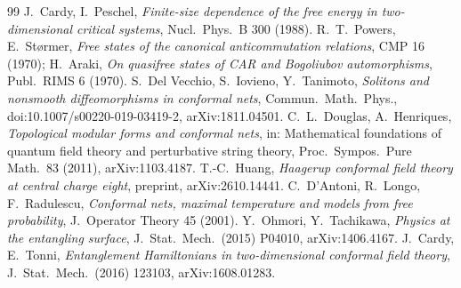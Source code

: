 \documentclass[11pt]{article}
\theoremstyle{definition}
\theoremstyle{remark}
\begin{document}
\begin{thebibliography}{99}
 J.~Cardy, I.~Peschel, \emph{Finite-size dependence of the free energy in two-dimensional critical systems}, Nucl.\ Phys.\ B 300 (1988).
 R.~T.~Powers, E.~St{\o}rmer, \emph{Free states of the canonical anticommutation relations}, CMP 16 (1970); H.~Araki, \emph{On quasifree states of CAR and Bogoliubov automorphisms}, Publ.\ RIMS 6 (1970).
 S.~Del Vecchio, S.~Iovieno, Y.~Tanimoto, \emph{Solitons and nonsmooth diffeomorphisms in conformal nets}, Commun.\ Math.\ Phys., doi:10.1007/s00220-019-03419-2, arXiv:1811.04501.
 C.~L.~Douglas, A.~Henriques, \emph{Topological modular forms and conformal nets}, in: Mathematical foundations of quantum field theory and perturbative string theory, Proc.\ Sympos.\ Pure Math.\ 83 (2011), arXiv:1103.4187.
 T.-C.~Huang, \emph{Haagerup conformal field theory at central charge eight}, preprint, arXiv:2610.14441.
 C.~D'Antoni, R.~Longo, F.~Radulescu, \emph{Conformal nets, maximal temperature and models from free probability}, J.\ Operator Theory 45 (2001).
 Y.~Ohmori, Y.~Tachikawa, \emph{Physics at the entangling surface}, J.\ Stat.\ Mech.\ (2015) P04010, arXiv:1406.4167.
 J.~Cardy, E.~Tonni, \emph{Entanglement Hamiltonians in two-dimensional conformal field theory}, J.\ Stat.\ Mech.\ (2016) 123103, arXiv:1608.01283.
\end{thebibliography}
\end{document}
